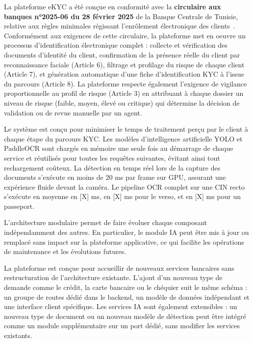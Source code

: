 \begin{description}[style=nextline, leftmargin=0pt, labelwidth=!, font=\bfseries\color{black}]
  La plateforme eKYC a été conçue en conformité avec la \textbf{circulaire aux banques n°2025-06 du 28 février 2025} de la Banque Centrale de Tunisie, relative aux règles minimales régissant l'enrôlement électronique des clients~\cite{bct2025circ06}. Conformément aux exigences de cette circulaire, la plateforme met en oeuvre un processus d'identification électronique complet : collecte et vérification des documents d'identité du client, confirmation de la présence réelle du client par reconnaissance faciale (Article 6), filtrage et profilage du risque de chaque client (Article 7), et génération automatique d'une fiche d'identification KYC à l'issue du parcours (Article 8). La plateforme respecte également l'exigence de vigilance proportionnelle au profil de risque (Article 3) en attribuant à chaque dossier un niveau de risque (faible, moyen, élevé ou critique) qui détermine la décision de validation ou de revue manuelle par un agent.

  \item[Performance]
  Le système est conçu pour minimiser le temps de traitement perçu par le client à chaque étape du parcours KYC. Les modèles d'intelligence artificielle YOLO et PaddleOCR sont chargés en mémoire une seule fois au démarrage de chaque service et réutilisés pour toutes les requêtes suivantes, évitant ainsi tout rechargement coûteux. La détection en temps réel lors de la capture des documents s'exécute en moins de 20 ms par frame sur GPU, assurant une expérience fluide devant la caméra. Le pipeline OCR complet sur une CIN recto s'exécute en moyenne en [X] ms, en [X] ms pour le verso, et en [X] ms pour un passeport.


  \item[Maintenabilité]
  L'architecture modulaire permet de faire évoluer chaque composant indépendamment des autres. En particulier, le module IA peut être mis à jour ou remplacé sans impact sur la plateforme applicative, ce qui facilite les opérations de maintenance et les évolutions futures.
  \item[Extensibilité]
  La plateforme est conçue pour accueillir de nouveaux services bancaires sans restructuration de l'architecture existante. L'ajout d'un nouveau type de demande comme le crédit, la carte bancaire ou le chéquier suit le même schéma : un groupe de routes dédié dans le backend, un modèle de données indépendant et une interface client spécifique. Les services IA sont également extensibles : un nouveau type de document ou un nouveau modèle de détection peut être intégré comme un module supplémentaire sur un port dédié, sans modifier les services existants.


\end{description}

